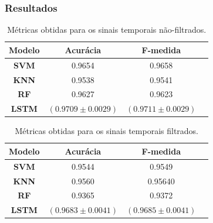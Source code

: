 \documentclass[aspectratio=169]{beamer}
\renewcommand{\indent}{\hspace*{2em}}
\begin{document}
\begin{frame}
	\frametitle{Resultados}
	\justifying

	\vspace{20pt}

	\indent{Utilizando as métricas indicadas anteriormente, foram obtidas as seguintes métricas para as representações utilizadas:}
	
	\begin{minipage}{0.5\textwidth}
	\tiny
	\begin{table}[H]
		\begin{center}
		\caption{Métricas obtidas para os sinais temporais não-filtrados.}
		\begin{tabular}{c c c c}
		\toprule
		\textbf{Modelo} & \textbf{Acurácia} & \textbf{F-medida} \\
		\midrule
		\textbf{SVM} & 0.9654 & 0.9658\\
		\textbf{KNN} & 0.9538 & 0.9541\\
		\textbf{RF} & 0.9627 & 0.9623\\
		\textbf{LSTM} & $(0.9709 \pm 0.0029)$ & $(0.9711 \pm 0.0029)$\\
		\bottomrule
		\end{tabular}
		\end{center}
	\end{table}
	\end{minipage}
	\hfill		
	\begin{minipage}{0.5\textwidth}
	\tiny
	\begin{table}[H]
		\begin{center}
		\caption{Métricas obtidas para os sinais temporais filtrados.}
		\begin{tabular}{c c c c}
		\toprule
		\textbf{Modelo} & \textbf{Acurácia} & \textbf{F-medida} \\
		\midrule
		\textbf{SVM} & 0.9544 & 0.9549\\
		\textbf{KNN} & 0.9560 & 0.95640\\
		\textbf{RF} & 0.9365 & 0.9372\\
		\textbf{LSTM} & $(0.9683 \pm 0.0041)$ & $(0.9685 \pm 0.0041)$\\
		\bottomrule
		\end{tabular}
		\end{center}
	\end{table}
	\end{minipage}
	

\end{frame}
\end{document}
